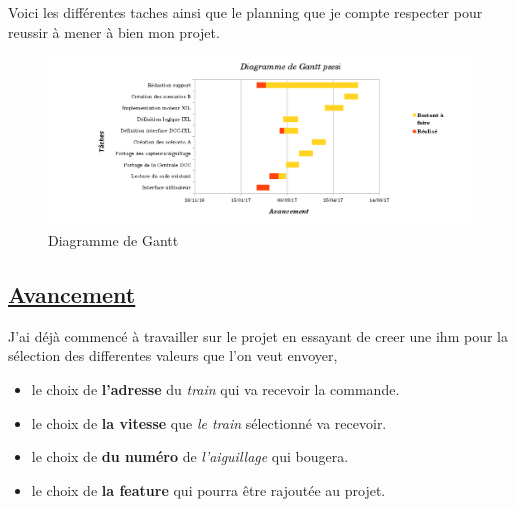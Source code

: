   Voici les différentes taches ainsi que le planning que je compte
respecter pour reussir à mener à bien mon projet.


\begin{figure}[ht]
\centering
\includegraphics[scale=0.5]{gantt.png}
\caption{Diagramme de Gantt}
\label{fig5}
\end{figure}

\subsection{\underline{ Avancement}}
\label{sec:avanc}

J'ai d\'ej\`a commenc\'e \`a travailler sur le projet en essayant de
creer une ihm pour la s\'election des differentes valeurs que l'on
veut envoyer, 
  \begin{itemize}
    \item le choix de \textbf{l'adresse} du \emph{train} qui va recevoir la commande.
    \item le choix de \textbf{la vitesse} que \emph{le train} s\'electionn\'e
      va recevoir.
    \item le choix de \textbf{du numéro} de \emph{l'aiguillage} qui bougera.
    \item le choix de \textbf{la feature} qui pourra \^etre rajout\'ee
      au projet.
  \end{itemize}

